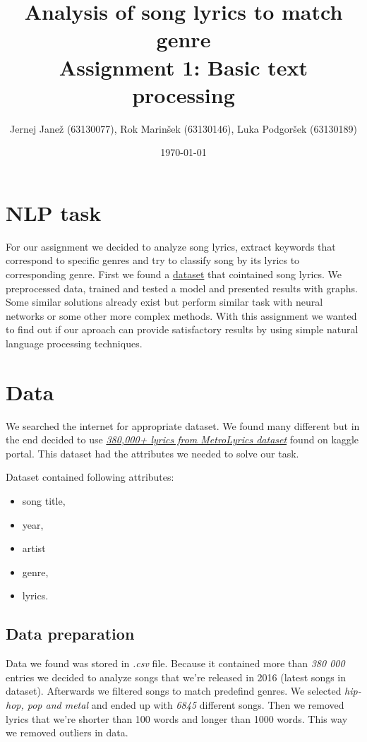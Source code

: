 \documentclass[a4paper,11pt]{article}
\title{%
Analysis of song lyrics to match genre \\
\large Assignment 1: Basic text processing}
\author{Jernej Janež (63130077), Rok Marinšek (63130146), Luka Podgoršek (63130189)}
\date{\today}
\begin{document}
\maketitle

\section{NLP task}
For our assignment we decided to analyze song lyrics, extract keywords that correspond to specific genres and try to classify song by its lyrics to corresponding genre. First we found a \href{https://www.kaggle.com/gyani95/380000-lyrics-from-metrolyrics}{dataset} that cointained song lyrics. We preprocessed data, trained and tested a model and presented results with graphs. Some similar solutions already exist but perform similar task with neural networks or some other more complex methods. With this assignment we wanted to find out if our aproach can provide satisfactory results by using simple natural language processing techniques.

\section{Data}
We searched the internet for appropriate dataset. We found many different but in the end decided to use \href{https://www.kaggle.com/gyani95/380000-lyrics-from-metrolyrics}{\textit{380,000+ lyrics from MetroLyrics dataset}} found on kaggle portal. This dataset had the attributes we needed to solve our task.

\noindent Dataset contained following attributes:
\begin{itemize}
\item song title,
\item year,
\item artist
\item genre,
\item lyrics.
\end{itemize}

\subsection{Data preparation}
Data we found was stored in \textit{.csv} file. Because it contained more than \textit{380 000} entries we decided to analyze songs that we're released in 2016 (latest songs in dataset). Afterwards we filtered songs to match predefind genres. We selected \textit{hip-hop, pop  and metal} and ended up with \textit{6845} different songs. Then we removed lyrics that we're shorter than 100 words and longer than 1000 words. This way we removed outliers in data.
\end{document}
